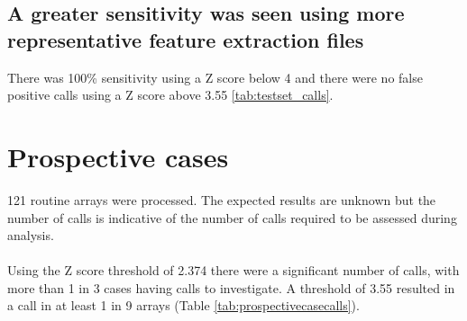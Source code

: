 \subsection{A greater sensitivity was seen using more representative feature extraction files}
There was 100\% sensitivity using a Z score below 4 and there were no false positive calls using a Z score above 3.55 \ref{tab:testset_calls}. 


\begin{table}[]
\centering
\caption[Test cases: Calls made at a range of thresholds]{Test cases: A call was made in the expected CNV region in all cases with a threshold below 4. There were no false positive calls made with a threshold above 3.55}
\label{tab:testcasetable}
\end{table}

\section{Prospective cases}
121 routine arrays were processed. The expected results are unknown but the number of calls is indicative of the number of calls required to be assessed during analysis.
\paragraph*{}
Using the Z score threshold of 2.374 there were a significant number of calls, with more than 1 in 3 cases having calls to investigate. A threshold of 3.55 resulted in a call in at least 1 in 9 arrays (Table \ref{tab:prospectivecasecalls}).

